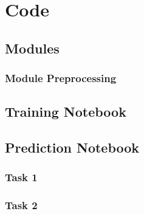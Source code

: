 

\chapter{Code} %

\label{AppendixA} %

\section{Modules}

\subsection{Module Preprocessing}



\section{Training Notebook}

\section{Prediction Notebook}

\subsection{Task 1}

\subsection{Task 2}
